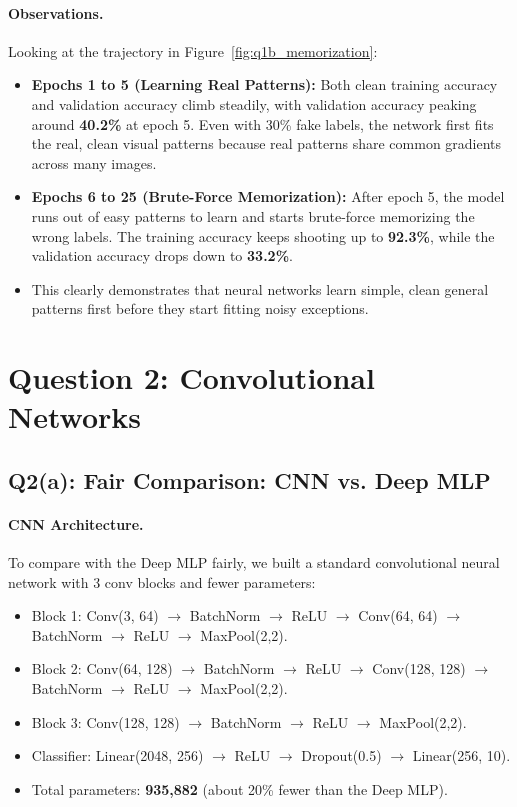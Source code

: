 \documentclass[10pt,twocolumn,letterpaper]{article}
\begin{document}
\paragraph{Observations.}
Looking at the trajectory in Figure~\ref{fig:q1b_memorization}:
\begin{itemize}
    \setlength{\itemsep}{1pt}
    \item \textbf{Epochs 1 to 5 (Learning Real Patterns):} Both clean training accuracy and validation accuracy climb steadily, with validation accuracy peaking around \textbf{40.2\%} at epoch 5. Even with 30\% fake labels, the network first fits the real, clean visual patterns because real patterns share common gradients across many images.
    \item \textbf{Epochs 6 to 25 (Brute-Force Memorization):} After epoch 5, the model runs out of easy patterns to learn and starts brute-force memorizing the wrong labels. The training accuracy keeps shooting up to \textbf{92.3\%}, while the validation accuracy drops down to \textbf{33.2\%}.
    \item This clearly demonstrates that neural networks learn simple, clean general patterns first before they start fitting noisy exceptions.
\end{itemize}

\section{Question 2: Convolutional Networks}

\subsection{Q2(a): Fair Comparison: CNN vs. Deep MLP}

\paragraph{CNN Architecture.}
To compare with the Deep MLP fairly, we built a standard convolutional neural network with 3 conv blocks and fewer parameters:
\begin{itemize}
    \setlength{\itemsep}{1pt}
    \item Block 1: Conv(3, 64) $\to$ BatchNorm $\to$ ReLU $\to$ Conv(64, 64) $\to$ BatchNorm $\to$ ReLU $\to$ MaxPool(2,2).
    \item Block 2: Conv(64, 128) $\to$ BatchNorm $\to$ ReLU $\to$ Conv(128, 128) $\to$ BatchNorm $\to$ ReLU $\to$ MaxPool(2,2).
    \item Block 3: Conv(128, 128) $\to$ BatchNorm $\to$ ReLU $\to$ MaxPool(2,2).
    \item Classifier: Linear(2048, 256) $\to$ ReLU $\to$ Dropout(0.5) $\to$ Linear(256, 10).
    \item Total parameters: \textbf{935,882} (about 20\% fewer than the Deep MLP).
\end{itemize}
\end{document}
